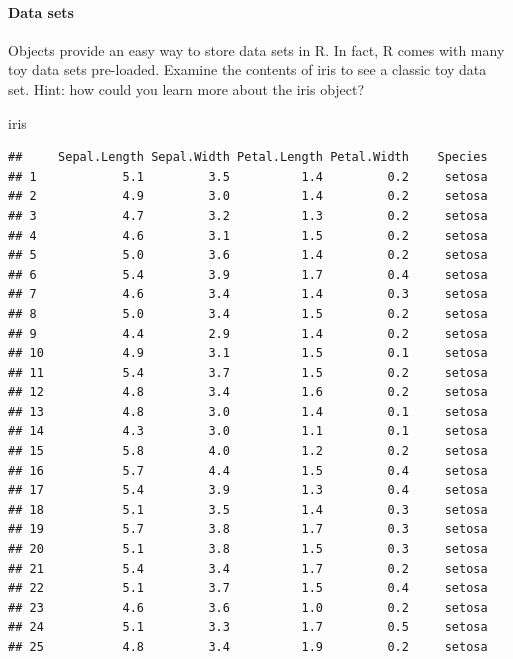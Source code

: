 \documentclass[
]{article}
\newenvironment{Shaded}{\begin{snugshade}}{\end{snugshade}}
\newcommand{\NormalTok}[1]{#1}
\begin{document}
\hypertarget{data-sets}{%
\paragraph{Data sets}\label{data-sets}}

Objects provide an easy way to store data sets in R. In fact, R comes
with many toy data sets pre-loaded. Examine the contents of iris to see
a classic toy data set. Hint: how could you learn more about the iris
object?

\begin{Shaded}
\begin{Highlighting}[]
\NormalTok{iris}
\end{Highlighting}
\end{Shaded}

\begin{verbatim}
##     Sepal.Length Sepal.Width Petal.Length Petal.Width    Species
## 1            5.1         3.5          1.4         0.2     setosa
## 2            4.9         3.0          1.4         0.2     setosa
## 3            4.7         3.2          1.3         0.2     setosa
## 4            4.6         3.1          1.5         0.2     setosa
## 5            5.0         3.6          1.4         0.2     setosa
## 6            5.4         3.9          1.7         0.4     setosa
## 7            4.6         3.4          1.4         0.3     setosa
## 8            5.0         3.4          1.5         0.2     setosa
## 9            4.4         2.9          1.4         0.2     setosa
## 10           4.9         3.1          1.5         0.1     setosa
## 11           5.4         3.7          1.5         0.2     setosa
## 12           4.8         3.4          1.6         0.2     setosa
## 13           4.8         3.0          1.4         0.1     setosa
## 14           4.3         3.0          1.1         0.1     setosa
## 15           5.8         4.0          1.2         0.2     setosa
## 16           5.7         4.4          1.5         0.4     setosa
## 17           5.4         3.9          1.3         0.4     setosa
## 18           5.1         3.5          1.4         0.3     setosa
## 19           5.7         3.8          1.7         0.3     setosa
## 20           5.1         3.8          1.5         0.3     setosa
## 21           5.4         3.4          1.7         0.2     setosa
## 22           5.1         3.7          1.5         0.4     setosa
## 23           4.6         3.6          1.0         0.2     setosa
## 24           5.1         3.3          1.7         0.5     setosa
## 25           4.8         3.4          1.9         0.2     setosa

\end{verbatim}
\end{document}
